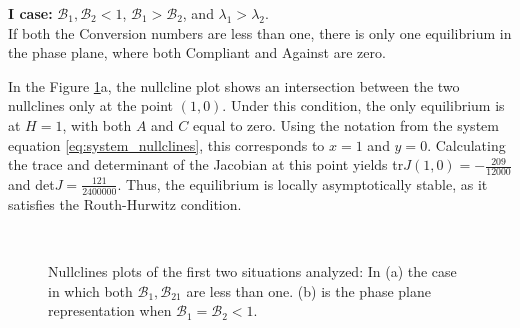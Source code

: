 \noindent\textbf{I case: }$\mathcal{B}_1, \mathcal{B}_2 <1$, $\mathcal{B}_1 >  \mathcal{B}_2$, and $\lambda_1 > \lambda_2$. \\
If both the Conversion numbers are less than one, there is only one equilibrium in the phase plane, where both Compliant and Against are zero.

In the Figure \ref{fig:r1r2less1dyn}a, the nullcline plot shows an intersection between the two nullclines only at the point $(1,0)$. Under this condition, the only equilibrium is at $H = 1$, with both $A$ and $C$ equal to zero. Using the notation from the system equation \eqref{eq:system_nullclines}, this corresponds to $x = 1$ and $y = 0$. Calculating the trace and determinant of the Jacobian at this point yields tr$J(1,0) = -\frac{209}{12000}$ and det$J = \frac{121}{2400000}$. Thus, the equilibrium is locally asymptotically stable, as it satisfies the Routh-Hurwitz condition.\\

\begin{figure}[ht]
	\centering
	 \quad
	 \\
	\caption[Nullclines first figure]{Nullclines plots of the first two situations analyzed: In (a) the case in which both $\mathcal{B}_1, \mathcal{B}_21$ are less than one. (b) is the phase plane representation when $\mathcal{B}_1 = \mathcal{B}_2 <1$.  }
	\label{fig:r1r2less1dyn}
\end{figure}

